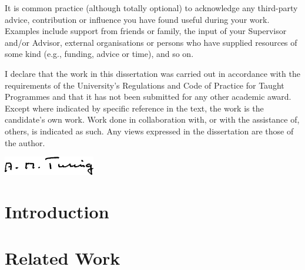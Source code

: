 \documentclass[
]{uob-thesis}
\begin{document}

\begin{acknowledgements}
It is common practice (although totally optional) to acknowledge any third-party advice, contribution or influence you have found useful during your work. Examples include support from friends or family, the input of your Supervisor and/or Advisor, external organisations or persons who have supplied resources of some kind (e.g., funding, advice or time), and so on.
\end{acknowledgements}

\begin{declaration}
  I declare that the work in this dissertation was carried out in accordance with the requirements of the University's Regulations and Code of Practice for Taught Programmes and that it has not been submitted for any other academic award. Except where indicated by specific reference in the text, the work is the candidate's own work. Work done in collaboration with, or with the assistance of, others, is indicated as such. Any views expressed in the dissertation are those of the author.
  \vspace{2cm}

  \includegraphics[width=4cm]{sig} %
\end{declaration}




\frontmatter

\tableofcontents
\listoftables
\listoffigures



\mainmatter

\chapter{Introduction}

  

\chapter{Related Work}
\end{document}
